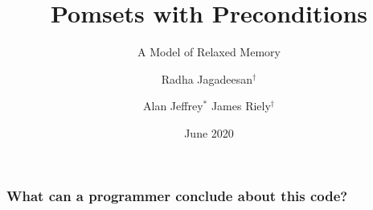 \documentclass[t]{beamer}
\title{Pomsets with Preconditions}
\subtitle{A Model of Relaxed Memory}
\author{Radha Jagadeesan$^\dagger$ \and Alan Jeffrey$^*$ James Riely$^\dagger$}
\date{June 2020}
\institute{$^*$Mozilla Research,  $^\dagger$DePaul University}
\begin{document}
\begin{frame}
  \maketitle
\end{frame}

\begin{frame}
  \frametitle{What can a programmer conclude about this code?}
\end{frame}
\end{document}
